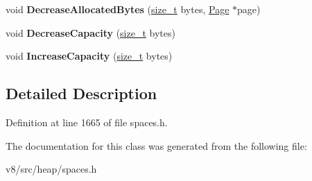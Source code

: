 \begin{DoxyCompactItemize}
void {\bfseries Decrease\+Allocated\+Bytes} (\mbox{\hyperlink{classsize__t}{size\+\_\+t}} bytes, \mbox{\hyperlink{classv8_1_1internal_1_1Page}{Page}} $\ast$page)
\item 
\mbox{\label{classv8_1_1internal_1_1AllocationStats_a6344dd3fb24f166f260401bf7917cd52}} 
void {\bfseries Decrease\+Capacity} (\mbox{\hyperlink{classsize__t}{size\+\_\+t}} bytes)
\item 
\mbox{\label{classv8_1_1internal_1_1AllocationStats_a2d4420ab92ac41b0d31013b745db6d6d}} 
void {\bfseries Increase\+Capacity} (\mbox{\hyperlink{classsize__t}{size\+\_\+t}} bytes)
\end{DoxyCompactItemize}


\subsection{Detailed Description}


Definition at line 1665 of file spaces.\+h.



The documentation for this class was generated from the following file\+:\begin{DoxyCompactItemize}
\item 
v8/src/heap/spaces.\+h\end{DoxyCompactItemize}
